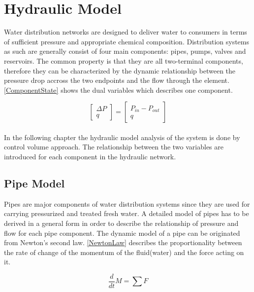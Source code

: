 \section{Hydraulic Model}
\label{HydraulicModel}

Water distribution networks are designed to deliver water to consumers in terms of sufficient pressure and appropriate chemical composition. Distribution systems as such are generally consist of four main components: pipes, pumps, valves and reservoirs. The common property is that they are all two-terminal components, therefore they can be characterized by the dynamic relationship between the pressure drop accross the two endpoints and the flow through the element.\cite{Kallesoe2009}  \eqref{ComponentState} shows the dual variables which describes one component. 

\begin{equation}
\label{ComponentState}
 \begin{bmatrix}
    \Delta P \\
    q
\end{bmatrix}
=
 \begin{bmatrix}
    P_{in} - P_{out} \\
    q
\end{bmatrix}
\end{equation}
\\
In the following chapter the hydraulic model analysis of the system is done by control volume approach.\cite{Hunt_Fluidmechanics} 
The relationship between the two variables are introduced for each component in the hydraulic network.


\subsection{Pipe Model} 
\label{PipeModel}
Pipes are major components of water distribution systems since they are used for carrying pressurized and treated fresh water. A detailed model of pipes has to be derived in a general form in order to describe the relationship of pressure and flow for each pipe component.  
%
The dynamic model of a pipe can be originated from Newton's second law. \eqref{NewtonLaw} describes the proportionality between the rate of change of the momentum of the fluid(water) and the force acting on it.

\begin{equation}
  \frac{d}{dt} M = \sum F
  \label{NewtonLaw}
\end{equation} 

